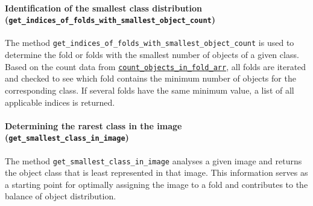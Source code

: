 \paragraph{Identification of the smallest class distribution \\(\lstinline|get_indices_of_folds_with_smallest_object_count|)\\}
\hypertarget{par:get_indices_folds_with_smallest_object_count}{}

The method \lstinline|get_indices_of_folds_with_smallest_object_count| is used to determine the fold or folds with the smallest number of objects of a given class. Based on the count data from \hyperlink{par:count_objects_in_fold_arr}{\lstinline|count_objects_in_fold_arr|}, all folds are iterated and checked to see which fold contains the minimum number of objects for the corresponding class. If several folds have the same minimum value, a list of all applicable indices is returned.

\paragraph{Determining the rarest class in the image (\lstinline|get_smallest_class_in_image|)}
\hypertarget{par:get_smallest_class_in_image}{}

The method \lstinline|get_smallest_class_in_image| analyses a given image and returns the object class that is least represented in that image. This information serves as a starting point for optimally assigning the image to a fold and contributes to the balance of object distribution.

